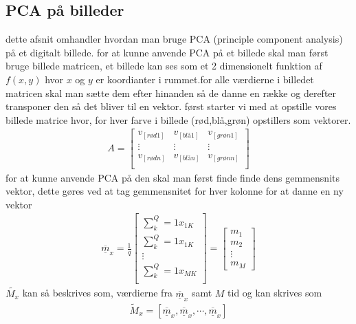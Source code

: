 \subsection{PCA på billeder}

dette afsnit omhandler hvordan man bruge PCA (principle component analysis) på et digitalt billede.
for at kunne anvende PCA på et billede skal man først bruge billede matricen, et billede kan ses som et 2 dimensionelt funktion af $f(x,y)$ hvor $x$ og $y$ er koordianter i rummet.for alle værdierne i billedet matricen skal man sætte dem efter hinanden så de danne en række og derefter transponer den så det bliver til en vektor. 
først starter vi med at opstille vores billede matrice hvor, for hver farve i billede (rød,blå,grøn) opstillers som vektorer. 
\begin{align*}
A = 
\begin{bmatrix}
v_[rød1] & v_[blå1] & v_[grøn1] \\
\vdots & \vdots & \vdots \\
v_[rødn] & v_[blån] & v_[grøn n] \\
\end{bmatrix}
\end{align*}
for at kunne anvende PCA på den skal man først finde finde dens gemmensnits vektor, dette gøres ved at tag gemmensnitet for hver kolonne for at danne en ny vektor
\begin{align*}
\overline{\underline{m}}_x = \frac{1}{q}
\begin{bmatrix}
\sum^Q_k=1 x_{1K} \\
\sum^Q_k=1 x_{1K} \\ 
\vdots \\
\sum^Q_k=1 x_{MK}  \\
\end{bmatrix}
=
\begin{bmatrix}
m_1 \\
m_2 \\
\vdots \\
m_M
\end{bmatrix}
\end{align*}
$\tilde{M_x}$ kan så beskrives som, værdierne fra $\overline{\underline{m}}_x$ samt $M$ tid og kan skrives som
\begin{align*}
\tilde{M}_x = [\overline{\underline{m}}_x,\overline{\underline{m}}_x,\cdots,\overline{\underline{m}}_x]
\end{align*} 

